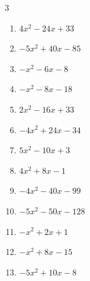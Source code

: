 \begin{multicols}{3}
\begin{enumerate}
  \item $4x^{2}-24x+33$


\columnbreak %

\resetques

  \item $-5x^{2}+40x-85$


  \item $-x^{2}-6x-8$


  \item $-x^{2}-8x-18$


  \item $2x^{2}-16x+33$


  \item $-4x^{2}+24x-34$


  \item $5x^{2}-10x+3$


  \item $4x^{2}+8x-1$


  \item $-4x^{2}-40x-99$


  \item $-5x^{2}-50x-128$


  \item $-x^{2}+2x+1$


\columnbreak %

  \item $-x^{2}+8x-15$


  \item $-5x^{2}+10x-8$



\end{enumerate}
\end{multicols}
